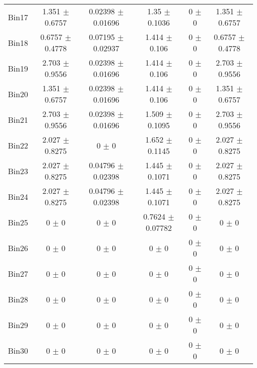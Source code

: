 \begin{tabular}{@{\extracolsep{4pt}}lccccc@{}}
     Bin17 & 1.351 $\pm$ 0.6757 & 0.02398 $\pm$ 0.01696 & 1.35 $\pm$ 0.1036 & 0 $\pm$ 0 & 1.351 $\pm$ 0.6757 \\ 
     Bin18 & 0.6757 $\pm$ 0.4778 & 0.07195 $\pm$ 0.02937 & 1.414 $\pm$ 0.106 & 0 $\pm$ 0 & 0.6757 $\pm$ 0.4778 \\ 
     Bin19 & 2.703 $\pm$ 0.9556 & 0.02398 $\pm$ 0.01696 & 1.414 $\pm$ 0.106 & 0 $\pm$ 0 & 2.703 $\pm$ 0.9556 \\ 
     Bin20 & 1.351 $\pm$ 0.6757 & 0.02398 $\pm$ 0.01696 & 1.414 $\pm$ 0.106 & 0 $\pm$ 0 & 1.351 $\pm$ 0.6757 \\ 
     Bin21 & 2.703 $\pm$ 0.9556 & 0.02398 $\pm$ 0.01696 & 1.509 $\pm$ 0.1095 & 0 $\pm$ 0 & 2.703 $\pm$ 0.9556 \\ 
     Bin22 & 2.027 $\pm$ 0.8275 & 0 $\pm$ 0 & 1.652 $\pm$ 0.1145 & 0 $\pm$ 0 & 2.027 $\pm$ 0.8275 \\ 
     Bin23 & 2.027 $\pm$ 0.8275 & 0.04796 $\pm$ 0.02398 & 1.445 $\pm$ 0.1071 & 0 $\pm$ 0 & 2.027 $\pm$ 0.8275 \\ 
     Bin24 & 2.027 $\pm$ 0.8275 & 0.04796 $\pm$ 0.02398 & 1.445 $\pm$ 0.1071 & 0 $\pm$ 0 & 2.027 $\pm$ 0.8275 \\ 
     Bin25 & 0 $\pm$ 0 & 0 $\pm$ 0 & 0.7624 $\pm$ 0.07782 & 0 $\pm$ 0 & 0 $\pm$ 0 \\ 
     Bin26 & 0 $\pm$ 0 & 0 $\pm$ 0 & 0 $\pm$ 0 & 0 $\pm$ 0 & 0 $\pm$ 0 \\ 
     Bin27 & 0 $\pm$ 0 & 0 $\pm$ 0 & 0 $\pm$ 0 & 0 $\pm$ 0 & 0 $\pm$ 0 \\ 
     Bin28 & 0 $\pm$ 0 & 0 $\pm$ 0 & 0 $\pm$ 0 & 0 $\pm$ 0 & 0 $\pm$ 0 \\ 
     Bin29 & 0 $\pm$ 0 & 0 $\pm$ 0 & 0 $\pm$ 0 & 0 $\pm$ 0 & 0 $\pm$ 0 \\ 
     Bin30 & 0 $\pm$ 0 & 0 $\pm$ 0 & 0 $\pm$ 0 & 0 $\pm$ 0 & 0 $\pm$ 0 \\ 
\hline\hline
  \end{tabular}
